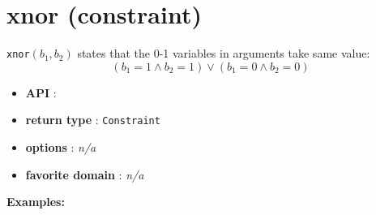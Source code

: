 \label{xnor}
\hypertarget{xnor}{}

\section{xnor (constraint)}\label{xnor:xnorconstraint}\hypertarget{xnor:xnorconstraint}{}
\begin{notedef}
    \texttt{xnor}$(b_1,b_2)$ states that the 0-1 variables in arguments take same value:
$$ (b_1=1 \land b_2=1) \lor (b_1=0 \land b_2=0)$$
\end{notedef}

\begin{itemize}
    \item \textbf{API} : 
	\item \textbf{return type} : \texttt{Constraint}
	\item \textbf{options} : \emph{n/a}
	\item \textbf{favorite domain} : \emph{n/a}
\end{itemize}

\textbf{Examples:}
